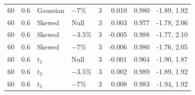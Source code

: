 \begin{table}[H]
\begin{tabular*}{\textwidth}{@{\extracolsep{\fill}}rrllrrrr}
60 & 0.6 & Gaussian & $-7\%$ & 3 & 0.010 & 0.980 & -1.89, 1.92 \\
60 & 0.6 & Skewed & Null & 3 & 0.003 & 0.977 & -1.78, 2.06 \\
60 & 0.6 & Skewed & $-3.5\%$ & 3 & -0.005 & 0.988 & -1.77, 2.10 \\
60 & 0.6 & Skewed & $-7\%$ & 3 & -0.006 & 0.980 & -1.76, 2.05 \\
60 & 0.6 & $t_3$ & Null & 3 & -0.001 & 0.964 & -1.90, 1.87 \\
60 & 0.6 & $t_3$ & $-3.5\%$ & 3 & 0.002 & 0.989 & -1.89, 1.92 \\
60 & 0.6 & $t_3$ & $-7\%$ & 3 & 0.008 & 0.983 & -1.94, 1.92 \\
\bottomrule
\end{tabular*}
\end{table}

